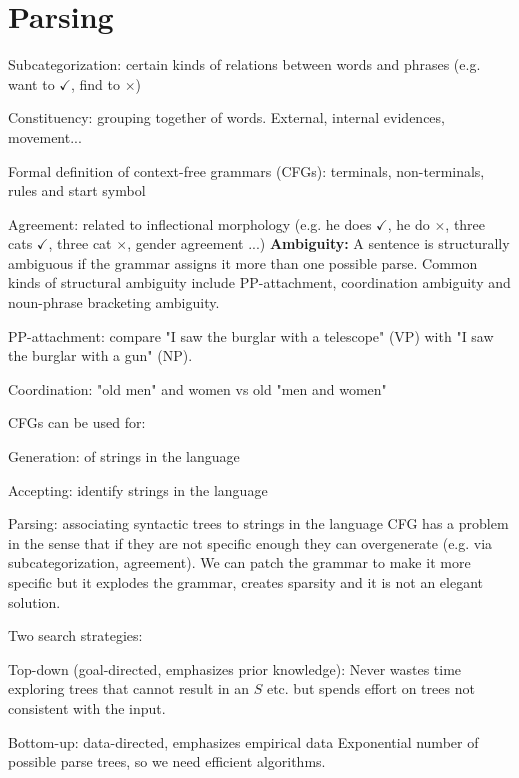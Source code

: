 \documentclass[12pt]{article}
\begin{document}
\section{Parsing}
\ulb
\item Subcategorization: certain kinds of relations between words and phrases (e.g. want to $\checkmark$, find to $\times$)
\item Constituency: grouping together of words. External, internal evidences, movement...
\item Formal definition of context-free grammars (CFGs): terminals, non-terminals, rules and start symbol
\item Agreement: related to inflectional morphology (e.g. he does $\checkmark$, he do $\times$, three cats $\checkmark$, three cat $\times$, gender agreement ...)
\ule
\textbf{Ambiguity:} A sentence is structurally ambiguous if the grammar assigns it more than one possible parse. Common kinds of structural ambiguity include PP-attachment, coordination ambiguity and noun-phrase bracketing ambiguity.
\par PP-attachment: compare "I saw the burglar with a telescope" (VP) with "I saw the burglar with a gun" (NP).
\par Coordination: "old men" and women vs old "men and women"
\par CFGs can be used for:
\ulb
\item Generation: of strings in the language
\item Accepting: identify strings in the language
\item Parsing: associating syntactic trees to strings in the language
\ule
CFG has a problem in the sense that if  they are not specific enough they can overgenerate (e.g. via subcategorization, agreement). We can patch the grammar to make it more specific but it explodes the grammar, creates sparsity and it is not an elegant solution.
\par Two search strategies:
\ulb
\item Top-down (goal-directed, emphasizes prior knowledge): 
Never wastes time exploring trees that cannot result in an $S$ etc. but spends effort on trees not consistent with the input.
\item Bottom-up: data-directed, emphasizes empirical data
\ule
Exponential number of possible parse trees, so we need efficient algorithms.
\end{document}
